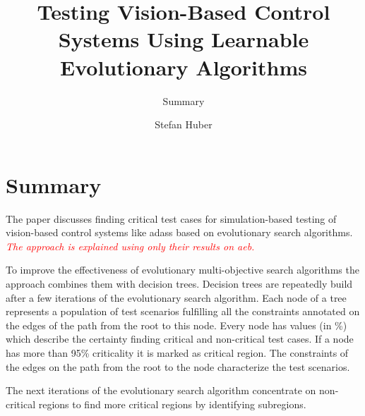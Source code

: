 \documentclass[oneside, notitlepage, twocolumn]{scrartcl}
\title{\LARGE Testing Vision-Based Control Systems Using Learnable Evolutionary Algorithms}
\subtitle{Summary}
\author{Stefan Huber}
\newcommand{\draft}[1]{\textcolor{red}{\textit{#1}}}
\begin{document}
\maketitle

\section{Summary}
The paper discusses finding critical test cases for simulation-based testing of vision-based control systems like \glspl{adas} based on evolutionary search algorithms.
\draft{The approach is explained using only their results on \gls{aeb}.}\par
To improve the effectiveness of evolutionary multi-objective search algorithms the approach combines them with decision trees.
Decision trees are repeatedly build after a few iterations of the evolutionary search algorithm.
Each node of a tree represents a population of test scenarios fulfilling all the constraints annotated on the edges of the path from the root to this node.
Every node has values (in \%) which describe the certainty finding critical and non-critical test cases.
If a node has more than 95\% criticality it is marked as critical region.
The constraints of the edges on the path from the root to the node characterize the test scenarios.\par
The next iterations of the evolutionary search algorithm concentrate on non-critical regions to find more critical regions by identifying subregions.\par
\end{document}
